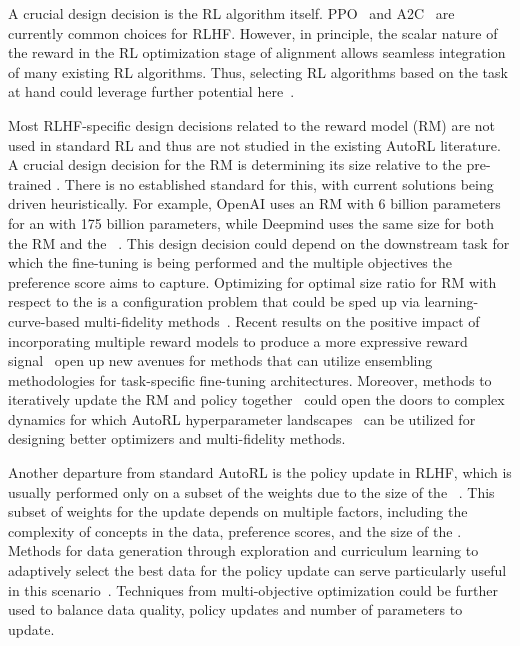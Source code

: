 A crucial design decision is the RL algorithm itself. PPO~\cite{schulman-arxiv17a} and A2C~\cite{mnih-icml16a} are currently common choices for RLHF.
However, in principle, the scalar nature of the reward in the RL optimization stage of \LLM alignment allows seamless integration of many existing RL algorithms.
Thus, selecting RL algorithms based on the task at hand could leverage further potential here~\cite{laroche-iclr18a}.


Most RLHF-specific design decisions related to the reward model (RM) are not used in standard RL and thus are not studied in the existing AutoRL literature.
A crucial design decision for the RM is determining its size relative to the pre-trained \LLM.
There is no established standard for this, with current solutions being driven heuristically.
For example, OpenAI uses an RM with 6 billion parameters for an \LLM with 175 billion parameters, while Deepmind uses the same size for both the RM and the \LLM~\cite{lambert-hf22a}.
This design decision could depend on the downstream task for which the fine-tuning is being performed and the multiple objectives the preference score aims to capture.
Optimizing for optimal size ratio for RM with respect to the \LLM is a configuration problem that could be sped up via learning-curve-based multi-fidelity methods~\cite{klein-iclr17a,jawed-ecml21a,ruhkopf-tmlr23a}.
Recent results on the positive impact of incorporating multiple reward models to produce a more expressive reward signal~\cite{wu-arxiv23a} open up new avenues for methods that can utilize ensembling methodologies for task-specific fine-tuning architectures.
Moreover, methods to iteratively update the RM and policy together~\cite{lambert-hf22a,bai-arxiv22a} could open the doors to complex dynamics for which AutoRL hyperparameter landscapes~\cite{mohan-automlconf23a} can be utilized for designing better optimizers and multi-fidelity methods.

Another departure from standard AutoRL is the policy update in RLHF, which is usually performed only on a subset of the weights due to the size of the \LLM~\cite{hu-iclr22a,glaese-arxiv22a}. 
This subset of weights for the update depends on multiple factors, including the complexity of concepts in the data, preference scores, and the size of the \LLM.
Methods for data generation through exploration and curriculum learning to adaptively select the best data for the policy update can serve particularly useful in this scenario~\cite{jiang-arxiv23}.
Techniques from multi-objective optimization could be further used to balance data quality, policy updates and number of parameters to update. 


